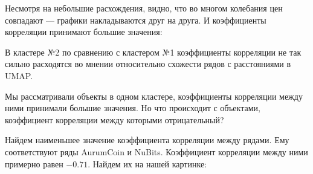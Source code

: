 \begin{figure}[H]
	\noindent {}
\end{figure}
\newpage
Несмотря на небольшие расхождения, видно, что во многом колебания цен совпадают --- графики накладываются друг на друга. И коэффициенты корреляции принимают большие значения:

\begin{figure}[H]
	\noindent {}
\end{figure} 

В кластере №2 по сравнению с кластером №1 коэффициенты корреляции не так сильно расходятся во мнении относительно схожести рядов с расстояниями в UMAP.

Мы рассматривали объекты в одном кластере, коэффициенты корреляции между ними принимали большие значения. Но что происходит с объектами, коэффициент корреляции между которыми отрицательный?

Найдем наименьшее значение коэффициента корреляции между рядами. Ему соответствуют ряды AurumCoin и NuBits. Коэффициент корреляции между ними примерно равен $-0.71$. Найдем их на нашей картинке:

